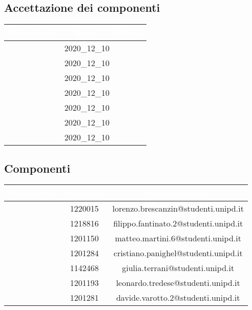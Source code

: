 \subsection{Accettazione dei componenti}
\begin{table}[H]
	\begin{center}
		\begin{tabular}{|c c c|}
			\rowcolor{darkblue}
			\textcolor{white}{Nominativo} 	& \textcolor{white}{Data} 	& \textcolor{white}{Firma} \\ \hline
							\BL 			&		2020\_12\_10			&\\ \hline
							\FF				&		2020\_12\_10			&\\ \hline
							\MM 			&		2020\_12\_10			&\\ \hline
							\PC 			&		2020\_12\_10			&\\ \hline
							\TG 			&		2020\_12\_10			&\\ \hline
							\TL 			&		2020\_12\_10			&\\ \hline
							\VD 			&		2020\_12\_10			&\\ \hline
		\end{tabular}
	\end{center}
\end{table}

\subsection{Componenti}
\begin{table}[H]%
	\begin{center}
		\begin{tabular}{|c c c|}
			\rowcolor{darkblue}
			\textcolor{white}{Nominativo} 	& \textcolor{white}{Matricola} 	& \textcolor{white}{Indirizzo email} 		\\ \hline
							\BL 			&			1220015				&	lorenzo.brescanzin@studenti.unipd.it	\\ \hline
							\FF				&			1218816				&	filippo.fantinato.2@studenti.unipd.it	\\ \hline
							\MM 			&			1201150				&	matteo.martini.6@studenti.unipd.it		\\ \hline
							\PC 			&			1201284				&	cristiano.panighel@studenti.unipd.it	\\ \hline
							\TG 			&			1142468				&	giulia.terrani@studenti.unipd.it		\\ \hline
							\TL 			&			1201193				&	leonardo.tredese@studenti.unipd.it		\\ \hline
							\VD 			&			1201281				& 	davide.varotto.2@studenti.unipd.it		\\ \hline
		\end{tabular}
	\end{center}
\end{table}
